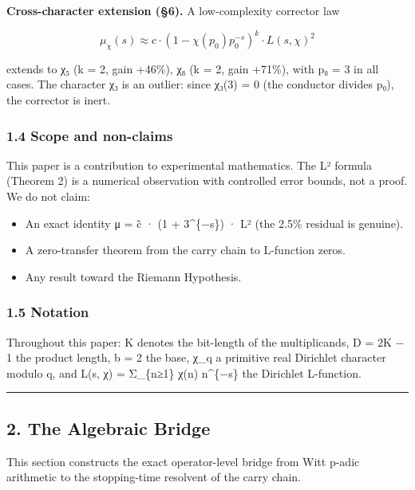 \documentclass[
  11pt,
]{article}
\providecommand{\tightlist}{%
  \setlength{\itemsep}{0pt}\setlength{\parskip}{0pt}}
\begin{document}
\textbf{Cross-character extension (§6).} A low-complexity corrector law

\[\mu_\chi(s) \approx c \cdot (1 - \chi(p_0) p_0^{-s})^k \cdot L(s, \chi)^2\]

extends to χ₅ (k = 2, gain +46\%), χ₈ (k = 2, gain +71\%), with p₀ = 3 in all
cases. The character χ₃ is an outlier: since χ₃(3) = 0 (the conductor divides
p₀), the corrector is inert.

\subsubsection{1.4 Scope and non-claims}\label{scope-and-non-claims}

This paper is a contribution to experimental mathematics. The L² formula
(Theorem 2) is a numerical observation with controlled error bounds, not a
proof. We do not claim:

\begin{itemize}
\tightlist
\item
  An exact identity μ = c̃ · (1 + 3\^{}\{−s\}) · L² (the 2.5\% residual is
  genuine).
\item
  A zero-transfer theorem from the carry chain to L-function zeros.
\item
  Any result toward the Riemann Hypothesis.
\end{itemize}

\subsubsection{1.5 Notation}\label{notation}

Throughout this paper: K denotes the bit-length of the multiplicands, D = 2K − 1
the product length, b = 2 the base, χ\_q a primitive real Dirichlet character
modulo q, and L(s, χ) = Σ\_\{n≥1\} χ(n) n\^{}\{−s\} the Dirichlet L-function.

\begin{center}\rule{0.5\linewidth}{0.5pt}\end{center}

\newpage

\subsection{2. The Algebraic Bridge}\label{the-algebraic-bridge}

This section constructs the exact operator-level bridge from Witt p-adic
arithmetic to the stopping-time resolvent of the carry chain.
\end{document}
